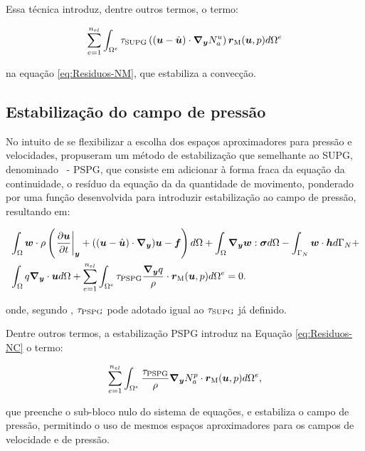 Essa técnica introduz, dentre outros termos, o termo:

\begin{equation}
    \sum_{e=1}^{n_{el}}{\int_{\Omega^e}{\tau_{\mathrm{SUPG}}\left({(\boldsymbol{u}-\hat{\boldsymbol{u}})\cdot\boldsymbol{\nabla_y} N_a^u}\right)\boldsymbol{r}_\mathrm{M}(\boldsymbol{u},p) d\Omega^e}}
\end{equation}

\noindent na equação \eqref{eq:Residuos-NM}, que estabiliza a convecção.

\subsection{Estabilização do campo de pressão}

No intuito de se flexibilizar a escolha dos espaços aproximadores para pressão e velocidades,  propuseram um método de estabilização que semelhante ao SUPG, denominado \PSPG\ - PSPG, que consiste em adicionar à forma fraca da equação da continuidade, o resíduo da equação da da quantidade de movimento, ponderado por uma função desenvolvida para introduzir estabilização ao campo de pressão, resultando em:

\begin{equation}
    \begin{split}
        &\int_{\Omega}{\boldsymbol{w}\cdot\rho\left({\left.\frac{\partial \boldsymbol{u}}{\partial t}\right|_{\boldsymbol{y}}+((\boldsymbol{u}-\hat{\boldsymbol{u}})\cdot\boldsymbol{\nabla_y})\boldsymbol{u}-\boldsymbol{f}}\right) d\Omega}+\int_{\Omega}{\boldsymbol{\nabla_y}\boldsymbol{w}:\boldsymbol{\sigma} d\Omega}-\int_{\Gamma_N}{\boldsymbol{w}\cdot\boldsymbol{h} d\Gamma_N}+\\
        &\int_{\Omega}{q\boldsymbol{\nabla_y}\cdot\boldsymbol{u} d\Omega}+\sum_{e=1}^{n_{el}}{\int_{\Omega^e}{\tau_{\mathrm{PSPG}}\frac{\boldsymbol{\nabla_y} q}{\rho}\cdot\boldsymbol{r}_\mathrm{M}(\boldsymbol{u},p) d\Omega^e}}=0\text{.}
    \end{split}
\end{equation}

\noindent onde, segundo , $\tau_{\mathrm{PSPG}}$ pode adotado igual ao $\tau_{\mathrm{SUPG}}$ já definido.

Dentre outros termos, a estabilização PSPG introduz na Equação \ref{eq:Residuos-NC} o termo:

\begin{equation}
    \sum_{e=1}^{n_{el}}{\int_{\Omega^e}{\frac{\tau_{\mathrm{PSPG}}}{\rho}\boldsymbol{\nabla_y} N_a^p\cdot\boldsymbol{r}_\mathrm{M}(\boldsymbol{u},p) d\Omega^e}}\text{,}
\end{equation}

\noindent que preenche o sub-bloco nulo do sistema de equações, e estabiliza o campo de pressão, permitindo o uso de mesmos espaços aproximadores para os campos de velocidade e de pressão.

